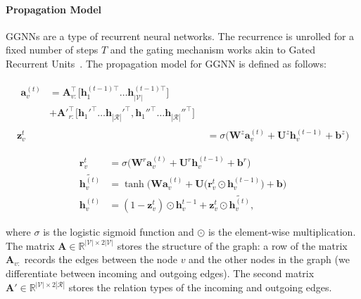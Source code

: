 \documentclass[11pt]{article}
\begin{document}
\paragraph{Propagation Model} GGNNs are a type of recurrent neural networks. The recurrence is unrolled for a fixed number of steps $T$ and the gating mechanism works akin to Gated Recurrent Units~\cite{Cho2014}. The propagation model for GGNN is defined as follows:

\begin{minipage}{0.44\linewidth}
\begin{align}
\begin{split}
  \mathbf{a}_v^{(t)} &= \mathbf{A}_{v:}^\top\big[\mathbf{h}_1^{(t-1)\top} \ldots  \mathbf{h}_{|\mathcal{V}|}^{(t-1)\top}\big] \\ &+ \mathbf{A'}_{r:}^\top\big[\mathbf{h}_1'^{\top} \ldots  \mathbf{h}_{|\mathcal{R}|}'^{\top}, \mathbf{h}_1''^{\top} \ldots  \mathbf{h}_{|\mathcal{R}|}''^{\top}\big]
  \end{split}
  \label{eq:ggnn-activations} \\[1ex]
  \mathbf{z}_v^t &= \sigma \big(\mathbf{W}^z\mathbf{a}_v^{(t)} + \mathbf{U}^z\mathbf{h}_v^{(t-1)} + \mathbf{b}^z\big)
  \label{eq:ggnn-update}
\end{align}
\end{minipage}\hfill \begin{minipage}{0.5\linewidth}
\begin{align}
  \mathbf{r}_v^t &= \sigma \big(\mathbf{W}^r\mathbf{a}_v^{(t)} + \mathbf{U}^r\mathbf{h}_v^{(t-1)} + \mathbf{b}^r\big)
  \label{eq:ggnn-reset} \\[1ex]
  \widetilde{\mathbf{h}_v^{(t)}} &= \tanh \big(\mathbf{W}\mathbf{a}_v^{(t)} + \mathbf{U}\big(\mathbf{r}_v^t\odot\mathbf{h}_v^{(t-1)}\big) + \mathbf{b}\big) \\[1ex]
  \mathbf{h}_v^{(t)} &= (1-\mathbf{z}_v^t) \odot \mathbf{h}_v^{t-1} + \mathbf{z}_v^t\odot\widetilde{\mathbf{h}_v^{(t)}},
\end{align}
\end{minipage}\vspace{2ex}
where $\sigma$ is the logistic sigmoid function and $\odot$ is the element-wise multiplication.
The matrix $\mathbf{A} \in \mathbb{R}^{|\mathcal{V}| \times 2|\mathcal{V}|}$ stores the structure of the graph: a row of the matrix $\mathbf{A}_{v:}$ records the edges between the node $v$ and the other nodes in the graph (we differentiate between incoming and outgoing edges). The second matrix $\mathbf{A}' \in \mathbb{R}^{|\mathcal{V}| \times 2|\mathcal{R}|}$ stores the relation types of the incoming and outgoing edges.
\end{document}

